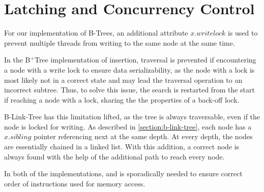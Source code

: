 \section{Latching and Concurrency Control}

For our implementation of B-Trees, an additional attribute $x.writelock$ is used to prevent multiple threads from writing to the same node at the same time.

In the B$^+$Tree implementation of insertion, traversal is prevented if encountering a node with a write lock to ensure data serializability, as the node with a lock is most likely not in a correct state and may lead the traversal operation to an incorrect subtree. Thus, to solve this issue, the search is restarted from the start if reaching a node with a lock, sharing the the properties of a back-off lock.

B-Link-Tree has this limitation lifted, as the tree is always traversable, even if the node is locked for writing. As described in \cref{section:b-link-tree}, each node has a $x.sibling$ pointer referencing next at the same depth. At every depth, the nodes are essentially chained in a linked list. With this addition, a correct node is always found with the help of the additional path to reach every node.

In both of the implementations,  and  is sporadically needed to ensure correct order of instructions used for memory access.